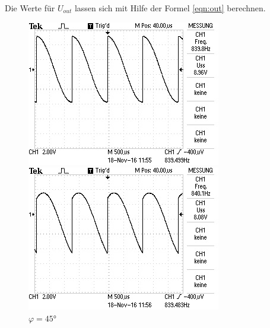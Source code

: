 Die Werte für $U_{out}$ lassen sich mit Hilfe der Formel \eqref{eqn:out} berechnen.\\

\begin{figure}[!h]
\begin{minipage}[t]{0.3\textwidth}
\includegraphics[width=\textwidth]{Bilder/15.jpg}
\caption{$\varphi = 15\si{\degree}$}
\label{fig:1}
\end{minipage}
\hspace{10pt}
\vspace{5pt}
\begin{minipage}[t]{0.3\textwidth}
\includegraphics[width=\textwidth]{Bilder/45.jpg}
\caption{$\varphi = 45\si{\degree}$}
\label{fig:2}

\end{minipage}
\end{figure}

